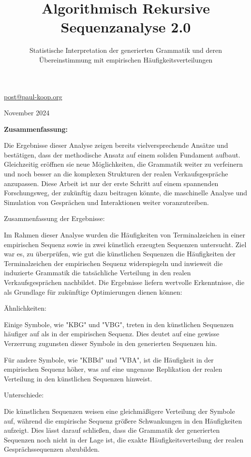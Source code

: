 \documentclass[
]{article}
\title{\protect\phantomsection\label{_stdyajrcip3u}{}Algorithmisch
Rekursive Sequenzanalyse 2.0}
\subtitle{\protect\phantomsection\label{_wargoqm4vfzj}{}Statistische
Interpretation der generierten Grammatik und deren Übereinstimmung mit
empirischen Häufigkeitsverteilungen}
\author{}
\date{}
\begin{document}
\maketitle

\href{mailto:post@paul-koop.org}{\ul{post@paul-koop.org}}

November 2024

\textbf{Zusammenfassung:}

Die Ergebnisse dieser Analyse zeigen bereits vielversprechende Ansätze
und bestätigen, dass der methodische Ansatz auf einem soliden Fundament
aufbaut. Gleichzeitig eröffnen sie neue Möglichkeiten, die Grammatik
weiter zu verfeinern und noch besser an die komplexen Strukturen der
realen Verkaufsgespräche anzupassen. Diese Arbeit ist nur der erste
Schritt auf einem spannenden Forschungsweg, der zukünftig dazu beitragen
könnte, die maschinelle Analyse und Simulation von Gesprächen und
Interaktionen weiter voranzutreiben.

Zusammenfassung der Ergebnisse:

Im Rahmen dieser Analyse wurden die Häufigkeiten von Terminalzeichen in
einer empirischen Sequenz sowie in zwei künstlich erzeugten Sequenzen
untersucht. Ziel war es, zu überprüfen, wie gut die künstlichen
Sequenzen die Häufigkeiten der Terminalzeichen der empirischen Sequenz
widerspiegeln und inwieweit die induzierte Grammatik die tatsächliche
Verteilung in den realen Verkaufsgesprächen nachbildet. Die Ergebnisse
liefern wertvolle Erkenntnisse, die als Grundlage für zukünftige
Optimierungen dienen können:

Ähnlichkeiten:

Einige Symbole, wie "KBG" und "VBG", treten in den künstlichen Sequenzen
häufiger auf als in der empirischen Sequenz. Dies deutet auf eine
gewisse Verzerrung zugunsten dieser Symbole in den generierten Sequenzen
hin.

Für andere Symbole, wie "KBBd" und "VBA", ist die Häufigkeit in der
empirischen Sequenz höher, was auf eine ungenaue Replikation der realen
Verteilung in den künstlichen Sequenzen hinweist.

Unterschiede:

Die künstlichen Sequenzen weisen eine gleichmäßigere Verteilung der
Symbole auf, während die empirische Sequenz größere Schwankungen in den
Häufigkeiten aufzeigt. Dies lässt darauf schließen, dass die Grammatik
der generierten Sequenzen noch nicht in der Lage ist, die exakte
Häufigkeitsverteilung der realen Gesprächssequenzen abzubilden.
\end{document}
